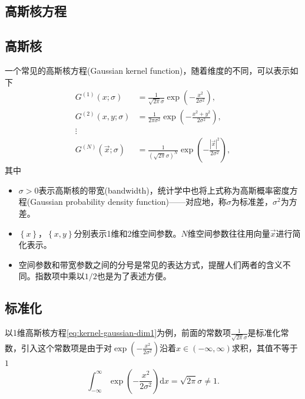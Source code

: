 \begin{subappendices}
\section{高斯核方程}
\label{sec:kernel-analysis}

\subsection{高斯核}
\label{sec:kernel-gaussian}
一个常见的高斯核方程(Gaussian kernel function)，随着维度的不同，可以表示如下
\begin{align}
  \label{eq:kernel-gaussian-dim1}
  G^{(1)} \left( x ; \sigma \right) & = \frac{1}{\sqrt{2 \pi} \sigma}
  \exp \left( - \frac{x^{2}}{2 \sigma^{2}} \right), \\
  \label{eq:kernel-gaussian-dim2}
  G^{(2)} \left( x,y; \sigma \right)
  & = \frac{1}{2 \pi \sigma^{2}}
  \exp \left(  - \frac{x^{2} + y^{2}}{2 \sigma^{2}} \right), \\
  \vdots & \nonumber \\
  \label{eq:kernel-gaussian-dimN}
  G^{(N)} \left( \vec{x} ; \sigma \right)
  & = \frac{1}{\left(\sqrt{2 \pi} \sigma \right)^{N}}
  \exp \left(
  - \frac{
  \left| \vec{x} \right|^{2}
  }{
  2 \sigma^{2}
  }
  \right),
\end{align}
其中
\begin{itemize}
\item $\sigma > 0$表示高斯核的带宽(bandwidth)，统计学中也将上式称为高斯概率密度方程(Gaussian probability density function)——对应地，称$\sigma$为标准差，$\sigma^{2}$为方差。
\item $\left\{ x \right\}$，$\left\{ x,y \right\}$分别表示1维和2维空间参数。$N$维空间参数往往用向量$\vec{x}$进行简化表示。
\item 空间参数和带宽参数之间的分号是常见的表达方式，提醒人们两者的含义不同。指数项中乘以$1/2$也是为了表述方便。
\end{itemize}

\subsection{标准化}
\label{sec:kernel-gaussian-normalization}
以1维高斯核方程\eqref{eq:kernel-gaussian-dim1}为例，前面的常数项$\frac{1}{\sqrt{2 \pi} \sigma}$是标准化常数，引入这个常数项是由于对$\exp \left( - \frac{x^{2}}{2 \sigma^{2}} \right)$沿着$x \in \left( - \infty, \infty \right)$求积，其值不等于$1$
\begin{equation*}
  \int_{-\infty}^{\infty} \exp \left( -
  \frac{x^{2}}{2 \sigma^{2}}
  \right) \mathrm{d} x = \sqrt{2 \pi} \sigma \neq 1.
\end{equation*}


\end{subappendices}
